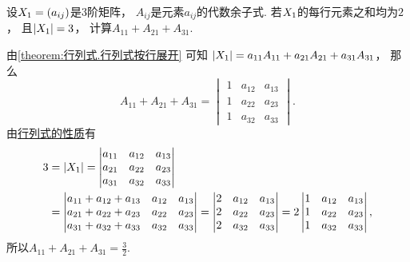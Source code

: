 \begin{example}
设\(X_1 = (a_{ij})\)是3阶矩阵，
\(A_{ij}\)是元素\(a_{ij}\)的代数余子式.
若\(X_1\)的每行元素之和均为\(2\)，
且\(\abs{X_1} = 3\)，
计算\(A_{11} + A_{21} + A_{31}\).
\begin{solution}
由\cref{theorem:行列式.行列式按行展开} 可知
\(\abs{X_1} = a_{11} A_{11} + a_{21} A_{21} + a_{31} A_{31}\)，
那么\begin{equation*}
	A_{11} + A_{21} + A_{31}
	= \begin{vmatrix}
		1 & a_{12} & a_{13} \\
		1 & a_{22} & a_{23} \\
		1 & a_{32} & a_{33}
	\end{vmatrix}.
\end{equation*}
由\hyperref[theorem:行列式.性质6]{行列式的性质}有\begin{align*}
	3 &= \abs{X_1} = \begin{vmatrix}
		a_{11} & a_{12} & a_{13} \\
		a_{21} & a_{22} & a_{23} \\
		a_{31} & a_{32} & a_{33}
	\end{vmatrix} \\
	&= \begin{vmatrix}
		a_{11} + a_{12} + a_{13} & a_{12} & a_{13} \\
		a_{21} + a_{22} + a_{23} & a_{22} & a_{23} \\
		a_{31} + a_{32} + a_{33} & a_{32} & a_{33}
	\end{vmatrix}
	= \begin{vmatrix}
		2 & a_{12} & a_{13} \\
		2 & a_{22} & a_{23} \\
		2 & a_{32} & a_{33}
	\end{vmatrix}
	= 2 \begin{vmatrix}
		1 & a_{12} & a_{13} \\
		1 & a_{22} & a_{23} \\
		1 & a_{32} & a_{33}
	\end{vmatrix},
\end{align*}
所以\(A_{11} + A_{21} + A_{31} = \frac32\).
\end{solution}
\end{example}

